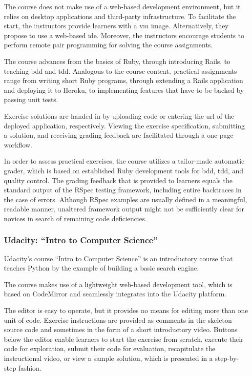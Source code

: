 The course does not make use of a web-based development environment, but it relies on desktop applications and third-party infrastructure. To facilitate the start, the instructors provide learners with a \gls{vm} image. Alternatively, they propose to use a web-based \gls{ide}. Moreover, the instructors encourage students to perform remote pair programming for solving the course assignments.

The course advances from the basics of Ruby, through introducing Rails, to teaching \gls{bdd} and \gls{tdd}. Analogous to the course content, practical assignments range from writing short Ruby programs, through extending a Rails application and deploying it to Heroku, to implementing features that have to be backed by passing unit tests.

Exercise solutions are handed in by uploading code or entering the \gls{url} of the deployed application, respectively. Viewing the exercise specification, submitting a solution, and receiving grading feedback are facilitated through a one-page workflow.

In order to assess practical exercises, the course utilizes a tailor-made automatic grader, which is based on established Ruby development tools for \gls{bdd}, \gls{tdd}, and quality control. The grading feedback that is provided to learners equals the standard output of the RSpec testing framework, including entire backtraces in the case of errors. Although RSpec examples are usually defined in a meaningful, readable manner, unaltered framework output might not be sufficiently clear for novices in search of remaining code deficiencies.

\subsubsection{Udacity: \texorpdfstring{“Intro to Computer Science”}{Intro to Computer Science}}

Udacity's course ``Intro to Computer Science'' is an introductory \cs course that teaches Python by the example of building a basic search engine.

The course makes use of a lightweight web-based development tool, which is based on CodeMirror and seamlessly integrates into the Udacity platform.

The editor is easy to operate, but it provides no means for editing more than one unit of code. Exercise instructions are provided as comments in the skeleton source code and sometimes in the form of a short introductory video. Buttons below the editor enable learners to start the exercise from scratch, execute their code for exploration, submit their code for evaluation, recapitulate the instructional video, or view a sample solution, which is presented in a step-by-step fashion.

